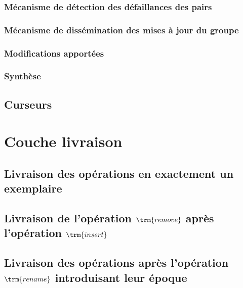 \subsubsection{Mécanisme de détection des défaillances des pairs}


\subsubsection{Mécanisme de dissémination des mises à jour du groupe}


\subsubsection{Modifications apportées}


\subsubsection{Synthèse}


\subsection{Curseurs}


\section{Couche livraison}
\label{sec:mute-livraison}



\subsection{Livraison des opérations en exactement un exemplaire}


\subsection{Livraison de l'opération $\trm{remove}$ après l'opération $\trm{insert}$}


\subsection{Livraison des opérations après l'opération $\trm{rename}$ introduisant leur époque}


